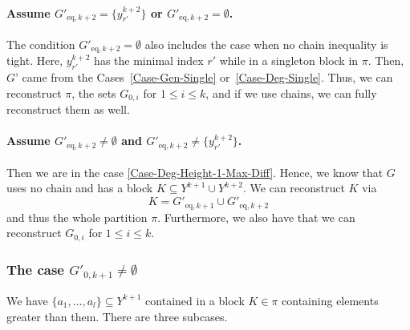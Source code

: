 \documentclass[12pt,a4paper]{amsart}
\theoremstyle{definition}
\begin{document}
\paragraph{Assume $G'_{\mathrm{eq},k+2}=\{y_{r'}^{k+2}\}$ or $G'_{\mathrm{eq},k+2}=\emptyset$.} The condition $G'_{\mathrm{eq},k+2}=\emptyset$ also includes the case when no chain inequality is tight.
Here, $y_{r'}^{{k+2}}$ has the minimal index $r'$ while in a singleton block in $\pi$.
Then, $G$' came from the Cases~\ref{Case-Gen-Single} or~\ref{Case-Deg-Single}.
Thus, we can reconstruct $\pi$, the sets $G_{0,i}$ for $1\leq i\leq k$, and if we use chains, we can fully reconstruct them as well.

\paragraph{Assume $G'_{\mathrm{eq},k+2}\neq\emptyset$ and $G'_{\mathrm{eq},k+2}\neq\{y_{r'}^{k+2}\}$.}
Then we are in the case \ref{Case-Deg-Height-1-Max-Diff}. Hence, we know that $G$ uses no chain and has a block $K\subseteq Y^{{k+1}}\cup Y^{{k+2}}$. 
We can reconstruct $K$ via 
\begin{equation*}
  K=G'_{\mathrm{eq},k+1}\cup G'_{\mathrm{eq},k+2}
\end{equation*}
and thus the whole partition $\pi$. 
Furthermore, we also have that we can reconstruct $G_{0,i}$ for $1\leq i\leq k$.

\subsubsection{The case $G'_{0,k+1}\neq\emptyset$}
We have $\{a_1,\dots,a_l\}\subseteq Y^{{k+1}}$ contained in a block $K\in\pi$ containing elements greater than them.
There are three subcases.
\end{document}
